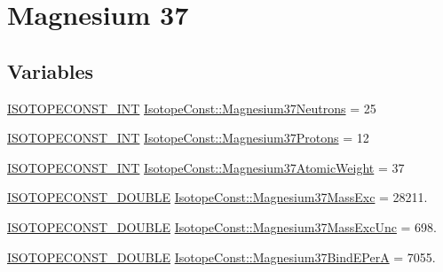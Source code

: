 \hypertarget{group___isotope_const-_magnesium-_mg37}{}\section{Magnesium 37}
\label{group___isotope_const-_magnesium-_mg37}
\subsection*{Variables}
\begin{DoxyCompactItemize}
\item 
\mbox{\hyperlink{group___isotope_const-_macros_ga5f18360b3e99483a35c32d789e62621c}{I\+S\+O\+T\+O\+P\+E\+C\+O\+N\+S\+T\+\_\+\+I\+NT}} \mbox{\hyperlink{group___isotope_const-_magnesium-_mg37_ga7be16a727c5d632d7a1c33e683cbb4e8}{Isotope\+Const\+::\+Magnesium37\+Neutrons}} = 25
\item 
\mbox{\hyperlink{group___isotope_const-_macros_ga5f18360b3e99483a35c32d789e62621c}{I\+S\+O\+T\+O\+P\+E\+C\+O\+N\+S\+T\+\_\+\+I\+NT}} \mbox{\hyperlink{group___isotope_const-_magnesium-_mg37_ga5f0e20253ed10f2abdaf6b072b465932}{Isotope\+Const\+::\+Magnesium37\+Protons}} = 12
\item 
\mbox{\hyperlink{group___isotope_const-_macros_ga5f18360b3e99483a35c32d789e62621c}{I\+S\+O\+T\+O\+P\+E\+C\+O\+N\+S\+T\+\_\+\+I\+NT}} \mbox{\hyperlink{group___isotope_const-_magnesium-_mg37_ga0d1ef0fc761d3cfe9c284979159283d8}{Isotope\+Const\+::\+Magnesium37\+Atomic\+Weight}} = 37
\item 
\mbox{\hyperlink{group___isotope_const-_macros_ga8f45a7272ce02c0b4c65c44636ed719a}{I\+S\+O\+T\+O\+P\+E\+C\+O\+N\+S\+T\+\_\+\+D\+O\+U\+B\+LE}} \mbox{\hyperlink{group___isotope_const-_magnesium-_mg37_ga5cbd4c78488270307aff14d234ff3f1a}{Isotope\+Const\+::\+Magnesium37\+Mass\+Exc}} = 28211.
\item 
\mbox{\hyperlink{group___isotope_const-_macros_ga8f45a7272ce02c0b4c65c44636ed719a}{I\+S\+O\+T\+O\+P\+E\+C\+O\+N\+S\+T\+\_\+\+D\+O\+U\+B\+LE}} \mbox{\hyperlink{group___isotope_const-_magnesium-_mg37_gad9c9dff8a146ee47b2bfffa5f3009480}{Isotope\+Const\+::\+Magnesium37\+Mass\+Exc\+Unc}} = 698.
\item 
\mbox{\hyperlink{group___isotope_const-_macros_ga8f45a7272ce02c0b4c65c44636ed719a}{I\+S\+O\+T\+O\+P\+E\+C\+O\+N\+S\+T\+\_\+\+D\+O\+U\+B\+LE}} \mbox{\hyperlink{group___isotope_const-_magnesium-_mg37_ga6fe2a27d31a3c2707195c3ad850c9064}{Isotope\+Const\+::\+Magnesium37\+Bind\+E\+PerA}} = 7055.
\item 

\end{DoxyCompactItemize}
